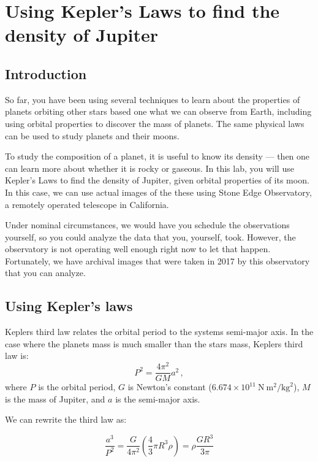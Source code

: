 \chapter{Using Kepler’s Laws to find the density of Jupiter}

\section{Introduction}

So far, you have been using several techniques to learn about the properties of planets orbiting other stars based one what we can observe from Earth, including using orbital properties to discover the mass of planets. The same physical laws can be used to study planets and their moons.

To study the composition of a planet, it is useful to know its density --- then one can learn more about whether it is rocky or gaseous. In this lab, you will use Kepler's Laws to find the density of Jupiter, given orbital properties of its moon. In this case, we can use actual images of the these using Stone Edge Observatory, a remotely operated telescope in California.

Under nominal circumstances, we would have you schedule the observations yourself, so you could analyze the data that you, yourself, took. However, the observatory is not operating well enough right now to let that happen. Fortunately, we have archival images that were taken in 2017 by this observatory that you can analyze.

\section{Using Kepler's laws}

Keplers third law relates the orbital period to the systems semi-major axis. In the case where the planets mass is much smaller than the stars mass, Keplers third law is:
\begin{equation}
P^2 = \frac{4\pi^2}{G M}a^2 \,,
\end{equation}
where $P$ is the orbital period, $G$ is Newton's constant ($6.674 \times 10^{11}\:\textrm{N}\:\textrm{m}^2/\textrm{kg}^2$), $M$ is the mass of Jupiter, and $a$ is the semi-major axis.

We can rewrite the third law as:

\begin{equation}
\frac{a^3}{P^2} = \frac{G}{4\pi^2}\left(\frac{4}{3}\pi R^3\rho \right) = \rho\frac{G R^3}{3\pi}
\end{equation}

